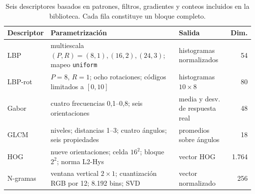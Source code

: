 \begin{table}[!ht]
\centering
\caption{Seis descriptores basados en patrones, filtros, gradientes y conteos incluidos en la biblioteca. Cada fila constituye un bloque completo.}
\label{tab:extractores-clasicos}
\fontsize{9}{11}\selectfont
\begin{tabular}{@{}l>{\raggedright\arraybackslash}p{7.0cm}>{\raggedright\arraybackslash}p{3.2cm}r@{}}
\toprule
Descriptor & Parametrización & Salida & Dim. \\
\midrule
LBP & multiescala $(P,R)=(8,1),(16,2),(24,3)$; mapeo \texttt{uniform} & histogramas normalizados & 54 \\
LBP-rot & $P=8$, $R=1$; ocho rotaciones; códigos limitados a $[0,10]$ & histogramas $10\times 8$ & 80 \\
Gabor & cuatro frecuencias 0,1--0,8; seis orientaciones & media y desv. de respuesta real & 48 \\
GLCM & 256 niveles; distancias 1--3; cuatro ángulos; seis propiedades & promedios sobre ángulos & 18 \\
HOG & nueve orientaciones; celda $16^2$; bloque $2^2$; norma L2-Hys & vector HOG & 1.764 \\
N-gramas & ventana vertical $2\times1$; cuantización RGB por 12; 8.192 bins; SVD & vector normalizado & 256 \\
\bottomrule
\end{tabular}
\end{table}

